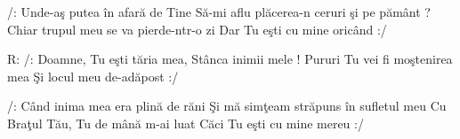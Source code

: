 
\beginverse
/: Unde-aş putea în afară de Tine
Să-mi aflu plăcerea-n ceruri şi pe pământ ?
Chiar trupul meu se va pierde-ntr-o zi
Dar Tu eşti cu mine oricând :/
\endverse

\beginchorus
R: /: Doamne, Tu eşti tăria mea,
Stânca inimii mele !
Pururi Tu vei fi moştenirea mea
Şi locul meu de-adăpost :/
\endchorus

\beginverse
/: Când inima mea era plină de răni
Şi mă simţeam străpuns în sufletul meu
Cu Braţul Tău, Tu de mână m-ai luat
Căci Tu eşti cu mine mereu :/
\endverse

\endsong
